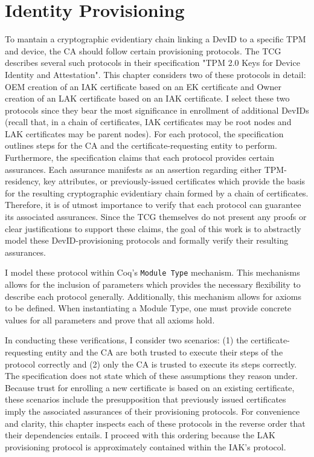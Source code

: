 \chapter{Identity Provisioning}


To mantain a cryptographic evidentiary chain linking a DevID to a specific TPM and device, the CA should follow certain provisioning protocols. The TCG describes several such protocols in their specification "TPM 2.0 Keys for Device Identity and Attestation". 
This chapter considers two of these protocols in detail: OEM creation of an IAK certificate based on an EK certificate and Owner creation of an LAK certificate based on an IAK certificate. I select these two protocols since they bear the most significance in enrollment of additional DevIDs (recall that, in a chain of certificates, IAK certificates may be root nodes and LAK certificates may be parent nodes). For each protocol, the specification outlines steps for the CA and the certificate-requesting entity to perform.
Furthermore, the specification claims that each protocol provides certain assurances. Each assurance manifests as an assertion regarding either TPM-residency, key attributes, or previously-issued certificates which provide the basis for the resulting cryptographic evidentiary chain formed by a chain of certificates. Therefore, it is of utmost importance to verify that each protocol can guarantee its associated assurances.
Since the TCG themselves do not present any proofs or clear justifications to support these claims, the goal of this work is to abstractly model these DevID-provisioning protocols and formally verify their resulting assurances.


I model these protocol within Coq's \verb|Module Type| mechanism. This mechanisms allows for the inclusion of parameters which provides the necessary flexibility to describe each protocol generally. Additionally, this mechanism allows for axioms to be defined. When instantiating a Module Type, one must provide concrete values for all parameters and prove that all axioms hold.

In conducting these verifications, I consider two scenarios: (1) the certificate-requesting entity and the CA are both trusted to execute their steps of the protocol correctly and (2) only the CA is trusted to execute its steps correctly. The specification does not state which of these assumptions they reason under. 
Because trust for enrolling a new certificate is based on an existing certificate, these scenarios include the presupposition that previously issued certificates imply the associated assurances of their provisioning protocols.
For convenience and clarity, this chapter inspects each of these protocols in the reverse order that their dependencies entails. I proceed with this ordering because the LAK provisioning protocol is approximately contained within the IAK's protocol. 



